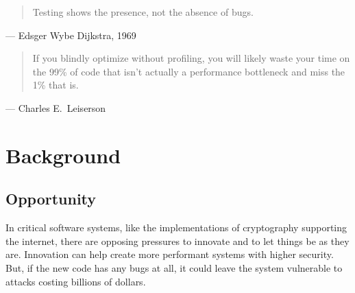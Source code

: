 \begin{quote}
  Testing shows the presence, not the absence of bugs.
\end{quote}
\begin{flushright}
  --- Edsger Wybe Dijkstra, 1969~\cite{naur1969software}
\end{flushright}

\begin{quote}
  If you blindly optimize without profiling, you will likely waste your time on the 99\% of code that isn't actually a performance bottleneck and miss the 1\% that is.
\end{quote}
\begin{flushright}
  --- Charles E.~Leiserson~\cite{Profiling2020Leiserson}
\end{flushright}


\chapter{Background}\label{ch:intro}

\section{Opportunity}\label{sec:intro:intro}


In critical software systems, like the implementations of cryptography supporting the internet, there are opposing pressures to innovate and to let things be as they are.
Innovation can help create more performant systems with higher security.
But, if the new code has any bugs at all, it could leave the system vulnerable to attacks costing billions of dollars.



